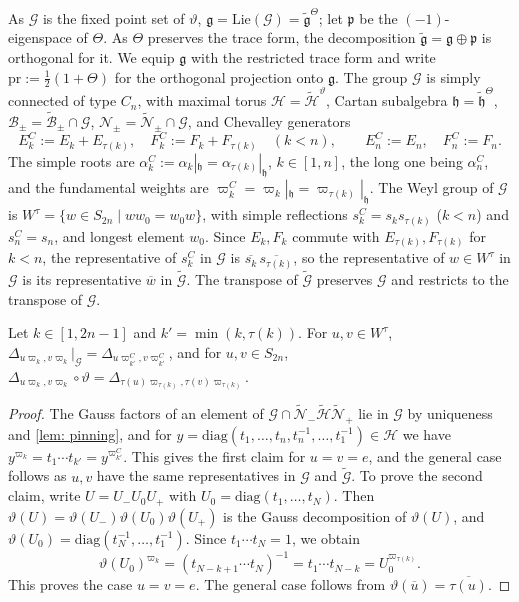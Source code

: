 \documentclass[a4paper]{amsart}
\numberwithin{equation}{section}
\theoremstyle{definition}
\theoremstyle{remark}
\newcommand{\mfh}{\mathfrak{h}}
\newcommand{\mfg}{\mathfrak{g}}
\newcommand{\mfp}{\mathfrak{p}}
\newcommand{\mcG}{\mathcal{G}}
\newcommand{\mcH}{\mathcal{H}}
\newcommand{\mcN}{\mathcal{N}}
\newcommand{\mcB}{\mathcal{B}}
\newcommand{\tG}{\widetilde{\mcG}}
\newcommand{\vt}{\vartheta}
\newcommand{\Vt}{\Theta}
\newcommand{\pr}{\mathrm{pr}}
\begin{document}
As $\mcG$ is the fixed point set of $\vt$, $\mfg=\mathrm{Lie}(\mcG)=\widetilde{\mfg}^\Vt$; let $\mfp$ be the $(-1)$-eigenspace of $\Vt$.
As $\Vt$ preserves the trace form, the decomposition $\widetilde{\mfg}=\mfg\oplus\mfp$ is orthogonal for it.
We equip $\mfg$ with the restricted trace form and write $\pr:=\frac12(1+\Vt)$ for the orthogonal projection onto $\mfg$.
The group $\mcG$ is simply connected of type $C_n$, with maximal torus $\mcH=\widetilde{\mcH}^\vt$, Cartan subalgebra $\mfh=\widetilde{\mfh}^\Vt$, $\mcB_\pm=\widetilde{\mcB}_\pm\cap\mcG$, $\mcN_\pm=\widetilde{\mcN}_\pm\cap\mcG$, and Chevalley generators
\[
  E^C_k:=E_k+E_{\tau(k)},\quad F^C_k:=F_k+F_{\tau(k)}\quad(k<n),
  \qquad
  E^C_n:=E_n,\quad F^C_n:=F_n.
\]
The simple roots are $\alpha^C_k:=\alpha_k|_\mfh=\alpha_{\tau(k)}|_\mfh$, $k\in[1,n]$, the long one being $\alpha^C_n$, and the fundamental weights are $\varpi^C_k=\varpi_k|_\mfh=\varpi_{\tau(k)}|_\mfh$.
The Weyl group of $\mcG$ is $W^\tau=\{w\in S_{2n}\mid ww_0=w_0w\}$, with simple reflections $s^C_k=s_ks_{\tau(k)}$ ($k<n$) and $s^C_n=s_n$, and longest element $w_0$.
  Since $E_k,F_k$ commute with $E_{\tau(k)},F_{\tau(k)}$ for $k<n$, the representative of $s^C_k$ in $\mcG$ is $\overline{s_k}\,\overline{s_{\tau(k)}}$, so the representative of $w\in W^\tau$ in $\mcG$ is its representative $\overline{w}$ in $\tG$.
The transpose of $\tG$ preserves $\mcG$ and restricts to the transpose of $\mcG$.

\begin{lemma}
  \label{lem: minors restrict}
  Let $k\in[1,2n-1]$ and $k'=\min(k,\tau(k))$.
  For $u,v\in W^\tau$, $\Delta_{u\varpi_k,v\varpi_k}|_\mcG=\Delta_{u\varpi^C_{k'},v\varpi^C_{k'}}$, and for $u,v\in S_{2n}$, $\Delta_{u\varpi_k,v\varpi_k}\circ\vt=\Delta_{\tau(u)\varpi_{\tau(k)},\tau(v)\varpi_{\tau(k)}}$.
\end{lemma}
\begin{proof}
  The Gauss factors of an element of $\mcG\cap\widetilde{\mcN}_-\widetilde{\mcH}\widetilde{\mcN}_+$ lie in $\mcG$ by uniqueness and \cref{lem: pinning}, and for $y=\mathrm{diag}(t_1,\dots,t_n,t_n^{-1},\dots,t_1^{-1})\in\mcH$ we have $y^{\varpi_k}=t_1\cdots t_{k'}=y^{\varpi^C_{k'}}$.
  This gives the first claim for $u=v=e$, and the general case follows as $u,v$ have the same representatives in $\mcG$ and $\tG$.
  To prove the second claim, write $U=U_-U_0U_+$ with $U_0=\mathrm{diag}(t_1,\dots,t_N)$.
  Then $\vt(U)=\vt(U_-)\vt(U_0)\vt(U_+)$ is the Gauss decomposition of $\vt(U)$, and $\vt(U_0)=\mathrm{diag}(t_N^{-1},\dots,t_1^{-1})$.
  Since $t_1\cdots t_N=1$, we obtain
  \[
    \vt(U_0)^{\varpi_k}=(t_{N-k+1}\cdots t_N)^{-1}=t_1\cdots t_{N-k}=U_0^{\varpi_{\tau(k)}}.
  \]
  This proves the case $u=v=e$. The general case follows from $\vt(\overline{u})=\overline{\tau(u)}$.
\end{proof}
\end{document}
